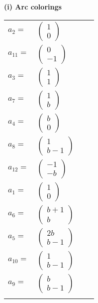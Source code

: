 \documentclass[1p]{elsarticle_modified}
\theoremstyle{definition}
\begin{document}
\flushleft \textbf{(i) Arc colorings}\\
\begin{tabular}{m{7pt} m{180pt} m{7pt} m{180pt} }
\flushright $a_{2}=$&$\begin{pmatrix}1\\0\end{pmatrix}$ \\
\flushright $a_{11}=$&$\begin{pmatrix}0\\-1\end{pmatrix}$ \\
\flushright $a_{3}=$&$\begin{pmatrix}1\\1\end{pmatrix}$ \\
\flushright $a_{7}=$&$\begin{pmatrix}1\\b\end{pmatrix}$ \\
\flushright $a_{4}=$&$\begin{pmatrix}b\\0\end{pmatrix}$ \\
\flushright $a_{8}=$&$\begin{pmatrix}1\\b-1\end{pmatrix}$ \\
\flushright $a_{12}=$&$\begin{pmatrix}-1\\- b\end{pmatrix}$ \\
\flushright $a_{1}=$&$\begin{pmatrix}1\\0\end{pmatrix}$ \\
\flushright $a_{6}=$&$\begin{pmatrix}b+1\\b\end{pmatrix}$ \\
\flushright $a_{5}=$&$\begin{pmatrix}2 b\\b-1\end{pmatrix}$ \\
\flushright $a_{10}=$&$\begin{pmatrix}1\\b-1\end{pmatrix}$ \\
\flushright $a_{9}=$&$\begin{pmatrix}b\\b-1\end{pmatrix}$\\&\end{tabular}
\end{document}
